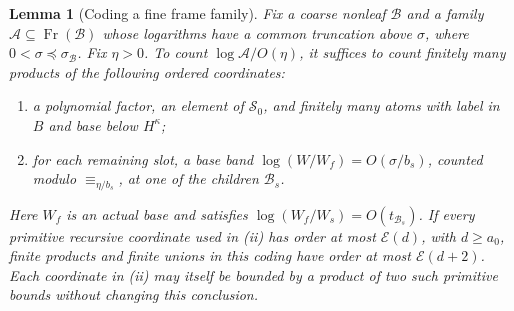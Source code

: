 \documentclass[11pt]{article}
\newtheorem{lemma}[theorem]{Lemma}
\theoremstyle{definition}
\theoremstyle{remark}
\newcommand{\EE}{\mathcal E}
\newcommand{\Fr}{\operatorname{Fr}}
\newcommand{\calB}{\mathcal B}
\newcommand{\calA}{\mathcal A}
\newcommand{\Bsmall}{\mathcal S_0}
\numberwithin{equation}{section}
\begin{document}
\begin{lemma}[Coding a fine frame family]\label{l-lem:coding}
Fix a coarse nonleaf $\calB$ and a family
$\calA\subseteq\Fr(\calB)$ whose logarithms have a common truncation
above $\sigma$, where $0<\sigma\preceq\sigma_{\calB}$.
Fix $\eta>0$. To count $\log\calA/O(\eta)$, it suffices to count finitely many
products of the following ordered coordinates:
\begin{enumerate}[label=\textup{(\roman*)},leftmargin=3em]
\item a polynomial factor, an element of $\Bsmall$, and finitely
many atoms with label in $B$ and base below $H^\kappa$;
\item for each remaining slot, a base band
$\log(W/W_f)=O(\sigma/b_s)$, counted modulo
$\equiv_{\eta/b_s}$, at one of the children $\calB_s$.
\end{enumerate}
Here $W_f$ is an actual base and satisfies
$\log(W_f/W_s)=O(t_{\calB_s})$.
If every primitive recursive coordinate used in \textup{(ii)}
has order at most $\EE(d)$, with $d\ge a_0$, finite products and
finite unions in this coding have order at most $\EE(d+2)$.
Each coordinate in \textup{(ii)} may itself be bounded by a product of
two such primitive bounds without changing this conclusion.
\end{lemma}
\end{document}
